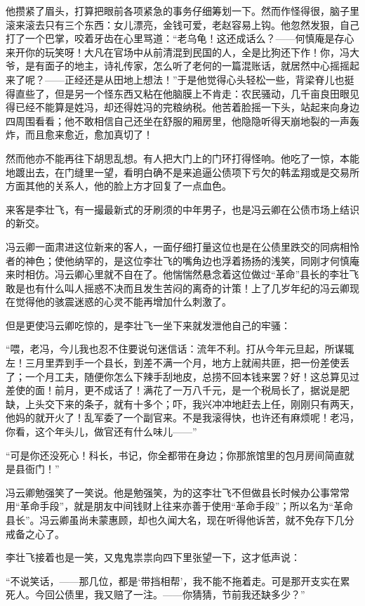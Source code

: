 \par 他攒紧了眉头，打算把眼前各项紧急的事务仔细筹划一下。然而作怪得很，脑子里滚来滚去只有三个东西：女儿漂亮，金钱可爱，老赵容易上钩。他忽然发狠，自己打了一个巴掌，咬着牙齿在心里骂道：“老乌龟！这还成话么？——何慎庵是存心来开你的玩笑呀！大凡在官场中从前清混到民国的人，全是比狗还下作！你，冯大爷，是有面子的地主，诗礼传家，怎么听了老何的一篇混账话，就居然中心摇摇起来了呢？——正经还是从田地上想法！”于是他觉得心头轻松一些，背梁脊儿也挺得直些了，但是另一个怪东西又粘在他脑膜上不肯走：农民骚动，几千亩良田眼见得已经不能算是姓冯，却还得姓冯的完粮纳税。他苦着脸摇一下头，站起来向身边四周围看看；他不敢相信自己还坐在舒服的厢房里，他隐隐听得天崩地裂的一声轰炸，而且愈来愈近，愈加真切了！
\par 然而他亦不能再往下胡思乱想。有人把大门上的门环打得怪响。他吃了一惊，本能地踱出去，在门缝里一望，看明白确不是来追逼公债项下亏欠的韩孟翔或是交易所方面其他的关系人，他的脸上方才回复了一点血色。
\par 来客是李壮飞，有一撮最新式的牙刷须的中年男子，也是冯云卿在公债市场上结识的新交。
\par 冯云卿一面肃进这位新来的客人，一面仔细打量这位也是在公债里跌交的同病相怜者的神色；使他纳罕的，是这位李壮飞的嘴角边也浮着扬扬的浅笑，同刚才何慎庵来时相仿。冯云卿心里就不自在了。他惴惴然悬念着这位做过“革命”县长的李壮飞敢是也有什么叫人摇惑不决而且发生苦闷的离奇的计策！上了几岁年纪的冯云卿现在觉得他的骇震迷惑的心灵不能再增加什么刺激了。
\par 但是更使冯云卿吃惊的，是李壮飞一坐下来就发泄他自己的牢骚：
\par “喂，老冯，今儿我也忍不住要说句迷信话：流年不利。打从今年元旦起，所谋辄左！三月里弄到手一个县长，到差不满一个月，地方上就闹共匪，把一份差使丢了；一个月工夫，随便你怎么下辣手刮地皮，总捞不回本钱来罢？好！这总算见过差使的面！前月，更不成话了！满花了一万八千元，是一个税局长了，据说是肥缺，上头交下来的条子，就有十多个；吓，我兴冲冲地赶去上任，刚刚只有两天，他妈的就开火了！乱军委了一个副官来。不是我滚得快，也许还有麻烦呢！老冯，你看，这个年头儿，做官还有什么味儿——”
\par “可是你还没死心！科长，书记，你全都带在身边；你那旅馆里的包月房间简直就是县衙门！”
\par 冯云卿勉强笑了一笑说。他是勉强笑，为的这李壮飞不但做县长时候办公事常常用“革命手段”，就是朋友中间钱财上往来亦善于使用“革命手段”；所以名为“革命县长”。冯云卿虽尚未蒙惠顾，却也久闻大名，现在听得他诉苦，就不免存下几分戒备之心了。
\par 李壮飞接着也是一笑，又鬼鬼祟祟向四下里张望一下，这才低声说：
\par “不说笑话，——那几位，都是‘带挡相帮’，我不能不拖着走。可是那开支实在累死人。今回公债里，我又赔了一注。——你猜猜，节前我还缺多少？”
